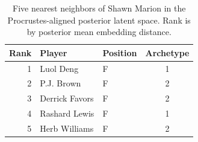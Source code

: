 \begin{table}[htbp]
  \centering\small
  \begin{tabular}{rllc}
    \toprule
    Rank & Player & Position & Archetype \\
    \midrule
    1 & Luol Deng & F & 1 \\
    2 & P.J. Brown & F & 2 \\
    3 & Derrick Favors & F & 2 \\
    4 & Rashard Lewis & F & 1 \\
    5 & Herb Williams & F & 2 \\
    \bottomrule
  \end{tabular}
  \caption{Five nearest neighbors of Shawn Marion in the Procrustes-aligned posterior latent space. Rank is by posterior mean embedding distance.}
  \label{tab:Shawn_Marion_neighbors}
\end{table}

